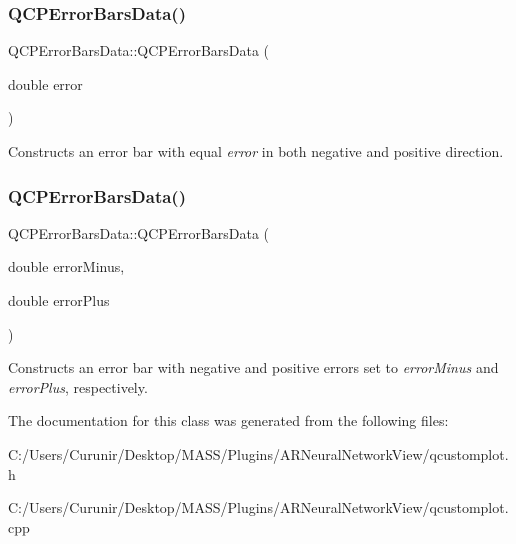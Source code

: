 \subsubsection{\texorpdfstring{Q\+C\+P\+Error\+Bars\+Data()}{QCPErrorBarsData()}\hspace{0.1cm}{\footnotesize\ttfamily [2/3]}}
{\footnotesize\ttfamily Q\+C\+P\+Error\+Bars\+Data\+::\+Q\+C\+P\+Error\+Bars\+Data (\begin{DoxyParamCaption}\item[{double}]{error }\end{DoxyParamCaption})\hspace{0.3cm}{\ttfamily [explicit]}}

Constructs an error bar with equal {\itshape error} in both negative and positive direction. \mbox{\label{class_q_c_p_error_bars_data_a7c61e42d87aea3312262d5429bc28387}} 
\subsubsection{\texorpdfstring{Q\+C\+P\+Error\+Bars\+Data()}{QCPErrorBarsData()}\hspace{0.1cm}{\footnotesize\ttfamily [3/3]}}
{\footnotesize\ttfamily Q\+C\+P\+Error\+Bars\+Data\+::\+Q\+C\+P\+Error\+Bars\+Data (\begin{DoxyParamCaption}\item[{double}]{error\+Minus,  }\item[{double}]{error\+Plus }\end{DoxyParamCaption})}

Constructs an error bar with negative and positive errors set to {\itshape error\+Minus} and {\itshape error\+Plus}, respectively. 

The documentation for this class was generated from the following files\+:\begin{DoxyCompactItemize}
\item 
C\+:/\+Users/\+Curunir/\+Desktop/\+M\+A\+S\+S/\+Plugins/\+A\+R\+Neural\+Network\+View/qcustomplot.\+h\item 
C\+:/\+Users/\+Curunir/\+Desktop/\+M\+A\+S\+S/\+Plugins/\+A\+R\+Neural\+Network\+View/qcustomplot.\+cpp\end{DoxyCompactItemize}
